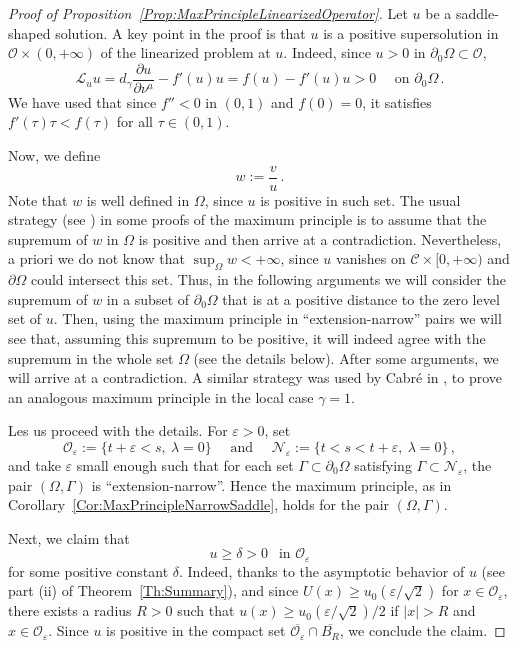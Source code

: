 \documentclass[12pt,reqno]{amsart}
\theoremstyle{definition}
\theoremstyle{remark}
\newcommand{\ccal}{\mathscr{C}}
\newcommand{\ocal}{\mathcal{O}}
\newcommand{\s}{\gamma}
\numberwithin{equation}{section}
\begin{document}
\begin{proof}[Proof of Proposition~\ref{Prop:MaxPrincipleLinearizedOperator}]
Let $u$ be a saddle-shaped solution. A key point in the proof is that $u$ is a positive supersolution in $\ocal\times(0,+\infty)$ of the linearized problem at $u$. Indeed, since $u>0$ in $\partial_0\Omega \subset \ocal$,
\begin{equation}
\label{Eq:uSupersolLinearized}
\mathscr{L}_u u = d_\s \dfrac{\partial u}{\partial \nu^a}  -f'(u) u = f(u) - f'(u) u > 0\quad \text{ on } \partial_0\Omega \,.
\end{equation}
We have used that since $f''<0$ in $(0,1)$ and $f(0)=0$, it satisfies $f'(\tau)\tau < f(\tau)$ for all $\tau\in (0,1)$.


Now, we define
$$
w := \dfrac{v}{u}\,.
$$
Note that $w$ is well defined in $\Omega$, since $u$ is positive in such set. The usual strategy (see \cite{BerestyckiNirembergVaradhan}) in some proofs of the maximum principle is to assume that the supremum of $w$ in $\Omega$ is positive and then arrive at a contradiction.  Nevertheless, a priori we do not know that $\sup_\Omega w< +\infty$, since $u$ vanishes on $\ccal\times [0,+\infty)$ and $\partial \Omega$ could intersect this set. Thus, in the following arguments we will consider the supremum of $w$ in a subset of $\partial_0 \Omega$ that is at a positive distance to the zero level set of $u$. Then, using the maximum principle in ``extension-narrow'' pairs we will see that, assuming this supremum to be positive, it will indeed agree with the supremum in the whole set $\Omega$ (see the details below). After some arguments, we will arrive at a contradiction. A similar strategy was used by Cabré in \cite{Cabre-Saddle}, to prove an analogous maximum principle in the local case $\s = 1$.


Les us proceed with the details. For $\varepsilon > 0$, set
$$
\ocal_\varepsilon := \{t +\varepsilon < s,\ \lambda = 0 \} \quad \textrm{ and } \quad \mathcal{N}_\varepsilon := \{t < s < t+\varepsilon ,\ \lambda = 0 \}\,,
$$
and take $\varepsilon$ small enough such that for each set $\Gamma \subset \partial_0 \Omega$ satisfying $\Gamma \subset \mathcal{N}_\varepsilon$, the pair $(\Omega, \Gamma)$  is ``extension-narrow''. Hence the maximum principle, as in Corollary~\ref{Cor:MaxPrincipleNarrowSaddle}, holds for the pair $(\Omega, \Gamma)$. 

Next, we claim that
\begin{equation}
	\label{Eq:u>delta}
	u \geq \delta >0\ \ \text{ in }   \ocal_\varepsilon
\end{equation}
for some positive constant $\delta$. Indeed, thanks to the asymptotic behavior of $u$ (see part (ii) of Theorem~\ref{Th:Summary}), and since $U(x) \geq u_0(\varepsilon/\sqrt{2})$ for $x\in \ocal_\varepsilon$,  there exists a radius $R>0$ such that $u(x) \geq u_0(\varepsilon/\sqrt{2})/2$ if $|x|>R$ and $x\in \ocal_\varepsilon$. Since $u$ is positive in the compact set $\overline{\ocal_\varepsilon} \cap \overline{B_R}$, we conclude the claim.


\end{proof}
\end{document}
